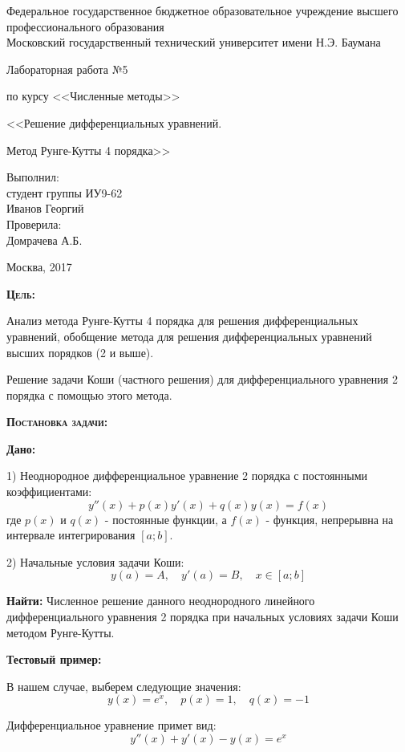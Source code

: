 \documentclass [12pt]{article}
\title{}
\date{}
\author{}
\begin{document}
\begin{titlepage}
\thispagestyle{empty}
\begin{center}
Федеральное государственное бюджетное образовательное учреждение высшего профессионального образования \\Московский государственный технический университет имени Н.Э. Баумана

\end{center}
\vfill
\centerline{\large{Лабораторная работа №5}}
\centerline{\large{по курсу <<Численные методы>>}}
\centerline{\large{<<Решение дифференциальных уравнений. }}
\centerline{\large{Метод Рунге-Кутты 4 порядка>>}}
\vfill
\hfill\parbox{5cm} {
           Выполнил:\\
           студент группы ИУ9-62 \hfill \\
           Иванов Георгий\hfill \medskip\\
           Проверила:\\
           Домрачева А.Б.\hfill
       }
\centerline{Москва, 2017}
\clearpage
\end{titlepage}

\textsc{\textbf{Цель:}} 

Анализ метода Рунге-Кутты 4 порядка для решения дифференциальных уравнений, обобщение метода для решения дифференциальных уравнений высших порядков (2 и выше). 

Решение задачи Коши (частного решения) для дифференциального уравнения 2 порядка с помощью этого метода.

\textsc{\textbf{Постановка задачи:}}

\textbf{Дано:}  

1) Неоднородное дифференциальное уравнение 2 порядка с постоянными коэффициентами: $$y''(x)+p(x)y'(x)+q(x)y(x)=f(x)$$ где $p(x)$ и $q(x)$ - постоянные функции, а $f(x)$ - функция, непрерывна на интервале интегрирования $[a;b]$.

2) Начальные условия задачи Коши: $$ y(a)=A, \quad y'(a)=B, \quad x \in [a;b] $$

 \textbf{Найти:} Численное решение данного неоднородного линейного дифференциального уравнения 2 порядка при начальных условиях задачи Коши методом Рунге-Кутты.

\textbf{Тестовый пример:} 

В нашем случае, выберем следующие значения:  $$y(x) = e^x, \quad p(x)=1, \quad q(x)=-1$$

Дифференциальное уравнение примет вид:  $$y''(x)+y'(x)-y(x)=e^x$$
\end{document}
